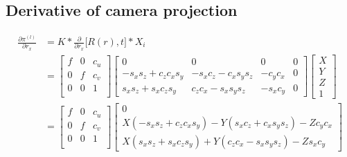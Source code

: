 \documentclass[10pt]{article}         %
\begin{document}
\subsection{Derivative of camera projection}
\begin{align*}
\frac{\partial \pi^{(l)}}{\partial r_x} &= K*\frac{\partial }{\partial r_x}\Big[R(r),t\Big]*X_i\\
&= \begin{bmatrix} f& 0& c_u\\ 0& f& c_v\\0& 0& 1\\ \end{bmatrix}\begin{bmatrix}
0& 0& 0& 0\\
-s_xs_z+c_zc_xs_y& -s_xc_z-c_xs_ys_z& -c_yc_x&0\\
s_xs_z+s_xc_zs_y& c_zc_x-s_xs_ys_z& -s_xc_y&0
\end{bmatrix}\begin{bmatrix}X\\Y\\Z\\1\end{bmatrix}\\
&=\begin{bmatrix} f& 0& c_u\\ 0& f& c_v\\0& 0& 1\\ \end{bmatrix}\begin{bmatrix}
0\\
X(-s_xs_z+c_zc_xs_y)-Y(s_xc_z+c_xs_ys_z)-Zc_yc_x\\
X(s_xs_z+s_xc_zs_y)+Y(c_zc_x-s_xs_ys_z)-Zs_xc_y
\end{bmatrix}\\
\end{align*}
\end{document}
